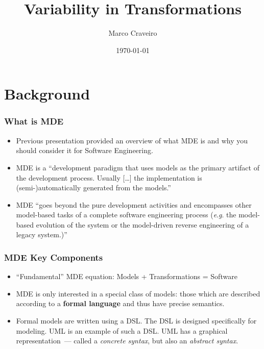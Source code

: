 \documentclass{beamer}
\title{Variability in Transformations}
\author{Marco Craveiro}
\date{\today}
\newcommand{\eg}{\textit{e}.\textit{g}. }
\begin{document}

\section{Background}

\begin{frame}
\frametitle{What is \ac{MDE}}

\begin{itemize}
\item Previous presentation provided an overview of what \ac{MDE} is
  and why you should consider it for Software Engineering.

\pause

\item \ac{MDE} is a ``development paradigm that uses models as the
  primary artifact of the development process. Usually [\ldots] the
  implementation is (semi-)automatically generated from the
  models.''\cite{brambilla2012model}

\pause

\item \ac{MDE} ``goes beyond the pure development activities and
  encompasses other model-based tasks of a complete software
  engineering process (\eg the model-based evolution of the system or
  the model-driven reverse engineering of a legacy
  system.)''\cite{brambilla2012model}

\end{itemize}

\end{frame}

\begin{frame}
\frametitle{\ac{MDE} Key Components}

\begin{itemize}

\item ``Fundamental'' \ac{MDE} equation: Models + Transformations =
  Software

\pause

\item \ac{MDE} is only interested in a special class of models: those
  which are described according to a \textbf{formal language} and thus
  have precise semantics.

\pause

\item Formal models are written using a \acf{DSL}. The \ac{DSL} is
  designed specifically for modeling. \acf{UML} is an example of such
  a \ac{DSL}. \ac{UML} has a graphical representation~--- called a
  \emph{concrete syntax}, but also an \emph{abstract syntax}.

\end{itemize}

\end{frame}
\end{document}
